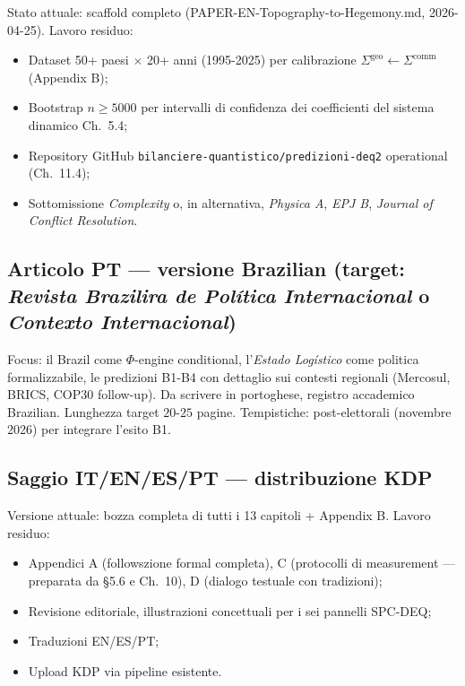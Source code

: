 Stato attuale: scaffold completo (PAPER-EN-Topography-to-Hegemony.md,
2026-04-25). Lavoro residuo:

\begin{itemize}
\tightlist
\item
  Dataset 50+ paesi $\times$ 20+ anni (1995-2025) per calibrazione
  \(\Sigma^{\text{geo}} \leftarrow \Sigma^{\text{comm}}\) (Appendix B);
\item
  Bootstrap \(n \geq 5000\) per intervalli di confidenza dei
  coefficienti del sistema dinamico Ch.~5.4;
\item
  Repository GitHub \texttt{bilanciere-quantistico/predizioni-deq2}
  operational (Ch.~11.4);
\item
  Sottomissione \emph{Complexity} o, in alternativa, \emph{Physica A},
  \emph{EPJ B}, \emph{Journal of Conflict Resolution}.
\end{itemize}

\subsection{\texorpdfstring{Articolo PT --- versione Brazilian (target:
\emph{Revista Brazilira de Política Internacional} o \emph{Contexto
Internacional})}{Articolo PT --- versione Brazilian (target: Revista Brazilira de Política Internacional o Contexto Internacional)}}\label{articolo-pt-versione-Brazilian-target-revista-brasileira-de-poluxedtica-internacional-o-contexto-internacional}

Focus: il Brazil come \(\Phi\)-engine conditional, l'\emph{Estado
Logístico} come politica formalizzabile, le predizioni B1-B4 con
dettaglio sui contesti regionali (Mercosul, BRICS, COP30 follow-up). Da
scrivere in portoghese, registro accademico Brazilian. Lunghezza target
\(20\)-\(25\) pagine. Tempistiche: post-elettorali (novembre 2026) per
integrare l'esito B1.

\subsection{Saggio IT/EN/ES/PT --- distribuzione
KDP}\label{saggio-itenespt-distribuzione-kdp}

Versione attuale: bozza completa di tutti i 13 capitoli + Appendix B.
Lavoro residuo:

\begin{itemize}
\tightlist
\item
  Appendici A (followszione formal completa), C (protocolli di
  measurement --- preparata da \S{}5.6 e Ch.~10), D (dialogo testuale con
  tradizioni);
\item
  Revisione editoriale, illustrazioni concettuali per i sei pannelli
  SPC-DEQ;
\item
  Traduzioni EN/ES/PT;
\item
  Upload KDP via pipeline esistente.
\end{itemize}



